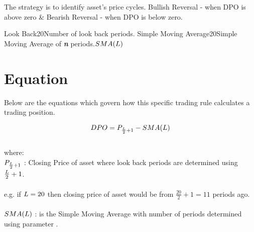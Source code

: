 \documentclass{article}
\begin{document}
\logo
{} %
\tblofcontents


\howtotrade
{The strategy is to identify asset's price cycles.
Bullish Reversal - when DPO is above zero \&
Bearish Reversal - when DPO is below zero.
}

{Look Back}{20}{Number of look back periods.}{\lookbacklength}
{Simple Moving Average}{20}{Simple Moving Average of \textit{\textbf{n}} periods.}{$SMA(L)$}
\stoptable %


\section{Equation}
Below are the equations which govern how this specific trading rule calculates a trading position.

\begin{equation}
DPO = P_{\frac{L}{2} + 1} - SMA(L)
\end{equation}
\\
where: \\
$P_{\frac{L}{2} + 1}$ : Closing Price of asset where look back periods are determined using $\frac{L}{2} + 1$.
\\ \\
e.g. if $L = 20$ then closing price of asset would be from $\frac{20}{2} +1 = 11$ periods ago.
\\ \\
$SMA(L)$ : is the Simple Moving Average with number of periods determined using parameter \lookbacklength.


\keyterms
\furtherlinks %
\end{document}
